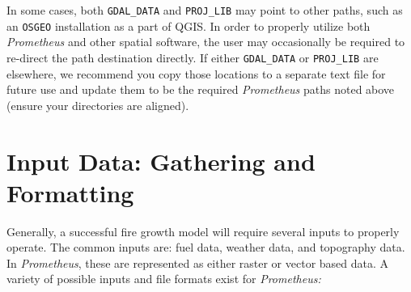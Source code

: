 \documentclass[
  letterpaper,
  DIV=11,
  numbers=noendperiod]{scrreprt}
\begin{document}
In some cases, both \texttt{GDAL\_DATA} and \texttt{PROJ\_LIB} may point
to other paths, such as an \texttt{OSGEO} installation as a part of
QGIS. In order to properly utilize both \emph{Prometheus} and other
spatial software, the user may occasionally be required to re-direct the
path destination directly. If either \texttt{GDAL\_DATA} or
\texttt{PROJ\_LIB} are elsewhere, we recommend you copy those locations
to a separate text file for future use and update them to be the
required \emph{Prometheus} paths noted above (ensure your directories
are aligned).


\chapter{Input Data: Gathering and
Formatting}\label{input-data-gathering-and-formatting}

Generally, a successful fire growth model will require several inputs to
properly operate. The common inputs are: fuel data, weather data, and
topography data. In \emph{Prometheus}, these are represented as either
raster or vector based data. A variety of possible inputs and file
formats exist for \emph{Prometheus:}
\end{document}
